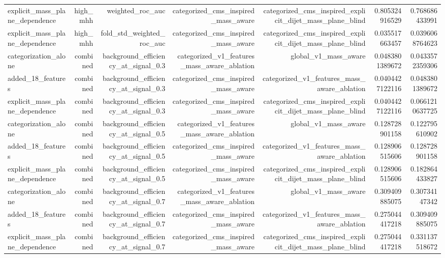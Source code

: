 \begin{table}[htbp]
{\begin{tabular}{lrrrrrr}
explicit\_mass\_plane\_dependence & high\_mhh & weighted\_roc\_auc & categorized\_cms\_inspired\_mass\_aware & categorized\_cms\_inspired\_explicit\_dijet\_mass\_plane\_blind & 0.805324916529 & 0.768686433991 \\
explicit\_mass\_plane\_dependence & high\_mhh & fold\_std\_weighted\_roc\_auc & categorized\_cms\_inspired\_mass\_aware & categorized\_cms\_inspired\_explicit\_dijet\_mass\_plane\_blind & 0.035517663457 & 0.0396068764623 \\
categorization\_alone & combined & background\_efficiency\_at\_signal\_0.3 & categorized\_v1\_features\_mass\_aware\_ablation & global\_v1\_mass\_aware & 0.0483801389672 & 0.0433572359306 \\
added\_18\_features & combined & background\_efficiency\_at\_signal\_0.3 & categorized\_cms\_inspired\_mass\_aware & categorized\_v1\_features\_mass\_aware\_ablation & 0.0404427122116 & 0.0483801389672 \\
explicit\_mass\_plane\_dependence & combined & background\_efficiency\_at\_signal\_0.3 & categorized\_cms\_inspired\_mass\_aware & categorized\_cms\_inspired\_explicit\_dijet\_mass\_plane\_blind & 0.0404427122116 & 0.0661210637725 \\
categorization\_alone & combined & background\_efficiency\_at\_signal\_0.5 & categorized\_v1\_features\_mass\_aware\_ablation & global\_v1\_mass\_aware & 0.128728901158 & 0.122795610902 \\
added\_18\_features & combined & background\_efficiency\_at\_signal\_0.5 & categorized\_cms\_inspired\_mass\_aware & categorized\_v1\_features\_mass\_aware\_ablation & 0.128906515606 & 0.128728901158 \\
explicit\_mass\_plane\_dependence & combined & background\_efficiency\_at\_signal\_0.5 & categorized\_cms\_inspired\_mass\_aware & categorized\_cms\_inspired\_explicit\_dijet\_mass\_plane\_blind & 0.128906515606 & 0.182864433827 \\
categorization\_alone & combined & background\_efficiency\_at\_signal\_0.7 & categorized\_v1\_features\_mass\_aware\_ablation & global\_v1\_mass\_aware & 0.309409885075 & 0.30734147342 \\
added\_18\_features & combined & background\_efficiency\_at\_signal\_0.7 & categorized\_cms\_inspired\_mass\_aware & categorized\_v1\_features\_mass\_aware\_ablation & 0.275044417218 & 0.309409885075 \\
explicit\_mass\_plane\_dependence & combined & background\_efficiency\_at\_signal\_0.7 & categorized\_cms\_inspired\_mass\_aware & categorized\_cms\_inspired\_explicit\_dijet\_mass\_plane\_blind & 0.275044417218 & 0.331137518672 \\

\end{tabular}}
\end{table}
